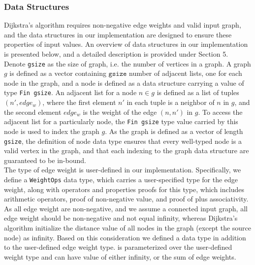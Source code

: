 \subsubsection{Data Structures}
Dijkstra's algorithm requires non-negative edge weights and valid input graph, and the data structures in our implementation are designed to ensure these properties of input values. An overview of data structures in our implementation is presented below, and a detailed description is provided under Section 5. 
\\

Denote \texttt{gsize} as the size of graph, i.e. the number of vertices in a graph. A graph $g$ is defined as a vector containing $\texttt{gsize}$ number of adjacent lists, one for each node in the graph, and a node is defined as a data structure carrying a value of type \texttt{Fin gsize}. An adjacent list for a node $n \in g$ is defined as a list of tuples $(n', edge_w)$, where the first element $n'$ in each tuple is a neighbor of $n$ in $g$, and the second element $edge_w$ is the weight of the edge $(n, n')$ in $g$. To access the adjacent list for a particularly node, the \texttt{Fin gsize} type value carried by this node is used to index the graph $g$. As the graph is defined as a vector of length \texttt{gsize}, the definition of node data type ensures that every well-typed node is a valid vertex in the graph, and that each indexing to the graph data structure are guaranteed to be in-bound.
\\

The type of edge weight is user-defined in our implementation. Specifically, we define a \texttt{WeightOps} data type, which carries a user-specified type for the edge weight, along with operators and properties proofs for this type, which includes arithmetic operators, proof of non-negative value, and proof of plus associativity. As all edge weight are non-negative, and we assume a connected input graph, all edge weight should be non-negative and not equal infinity, whereas Dijkstra's algorithm initialize the distance value of all nodes in the graph (except the source node) as infinity. Based on this consideration we defined a  data type in addition to the user-defined edge weight type.  is parameterized over the user-defined weight type and can have value of either infinity, or the sum of edge weights. 

